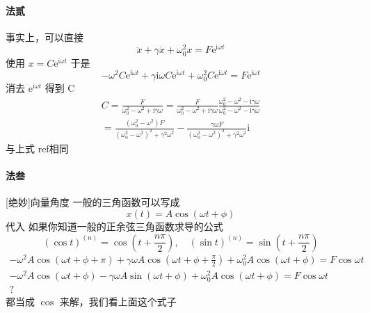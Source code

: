 \documentclass[11pt]{book}
\begin{document}
\paragraph{法贰}事实上，可以直接
\begin{equation}
\label{eq:66}
\ddot{x}+\gamma \dot{x}+\omega_0^2x=F\mathrm{e}^{\mathrm{i}\omega t}
\end{equation}
使用 \(x=C\mathrm{e}^{\mathrm{i}\omega t}\)
于是
\begin{equation}
\label{eq:67}
-\omega^2C\mathrm{e}^{\mathrm{i}\omega t}+\gamma \mathrm{i}\omega C\mathrm{e}^{\mathrm{i}\omega t}+\omega_0^2C\mathrm{e}^{\mathrm{i}\omega t}=F\mathrm{e}^{\mathrm{i}\omega t} 
\end{equation}
消去 \(\mathrm{e}^{\mathrm{i}\omega t}\) 得到 C
\begin{equation}
\label{eq:68}
\begin{split}
C = \frac{F}{\omega_0^2-\omega^2+\mathrm{i}\gamma\omega}=\frac{F}{\omega_0^2-\omega^2+\mathrm{i}\gamma\omega}\frac{\omega_0^2-\omega^2-\mathrm{i}\gamma\omega}{\omega_0^2-\omega^2-\mathrm{i}\gamma\omega} \\
=\frac{(\omega_0^2-\omega^2)F}{(\omega_0^2-\omega^2)^2+\gamma^2\omega^2}
-
\frac{\gamma\omega F}{(\omega_0^2-\omega^2)^2+\gamma^2\omega^2}\mathrm{i}
\end{split}
\end{equation}
与上式
ref相同


\paragraph{法叁}[绝妙]向量角度
一般的三角函数可以写成
\begin{equation}
\label{eq:69}
x(t)=A\cos(\omega t+\phi)
\end{equation}
代入
如果你知道一般的正余弦三角函数求导的公式
\begin{equation}
\label{eq:71}
(\cos t)^{(n)}=\cos(t+\frac{n\pi}{2}),\quad (\sin t)^{(n)}=\sin(t+\frac{n\pi}{2})
\end{equation}
\begin{align}
\label{eq:70}
-\omega^2A\cos(\omega t+\phi+\pi)+\gamma\omega A\cos(\omega t+\phi+\frac{\pi}{2})+\omega_0^2A\cos(\omega t+\phi)=F\cos\omega t\\
-\omega^2A\cos(\omega t+\phi)-\gamma\omega A\sin(\omega t+\phi)+\omega_0^2A\cos(\omega t+\phi)=F\cos\omega t\\
?
\end{align}
都当成 \(\cos\) 来解，我们看上面这个式子
\end{document}
